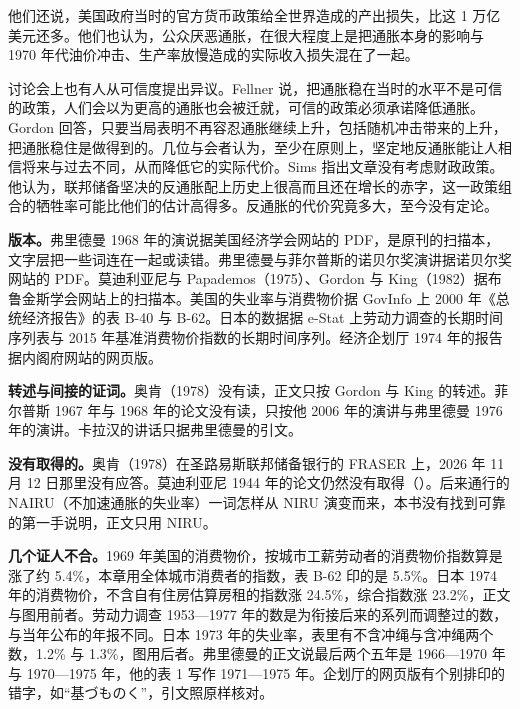 他们还说，美国政府当时的官方货币政策给全世界造成的产出损失，比这 1 万亿美元还多\cite{gordon1982}。他们也认为，公众厌恶通胀，在很大程度上是把通胀本身的影响与 1970 年代油价冲击、生产率放慢造成的实际收入损失混在了一起\cite{gordon1982}。

讨论会上也有人从可信度提出异议。Fellner 说，把通胀稳在当时的水平不是可信的政策，人们会以为更高的通胀也会被迁就，可信的政策必须承诺降低通胀\cite{gordon1982}。Gordon 回答，只要当局表明不再容忍通胀继续上升，包括随机冲击带来的上升，把通胀稳住是做得到的\cite{gordon1982}。几位与会者认为，至少在原则上，坚定地反通胀能让人相信将来与过去不同，从而降低它的实际代价\cite{gordon1982}。Sims 指出文章没有考虑财政政策\cite{gordon1982}。他认为，联邦储备坚决的反通胀配上历史上很高而且还在增长的赤字，这一政策组合的牺牲率可能比他们的估计高得多\cite{gordon1982}。反通胀的代价究竟多大，至今没有定论。

\begin{deeper}[史料说明]
\textbf{版本。}弗里德曼 1968 年的演说据美国经济学会网站的 PDF，是原刊的扫描本，文字层把一些词连在一起或读错。弗里德曼与菲尔普斯的诺贝尔奖演讲据诺贝尔奖网站的 PDF。莫迪利亚尼与 Papademos（1975）、Gordon 与 King（1982）据布鲁金斯学会网站上的扫描本。美国的失业率与消费物价据 GovInfo 上 2000 年《总统经济报告》的表 B-40 与 B-62。日本的数据据 e-Stat 上劳动力调查的长期时间序列表与 2015 年基准消费物价指数的长期时间序列。经济企划厅 1974 年的报告据内阁府网站的网页版。

\textbf{转述与间接的证词。}奥肯（1978）没有读，正文只按 Gordon 与 King 的转述。菲尔普斯 1967 年与 1968 年的论文没有读，只按他 2006 年的演讲与弗里德曼 1976 年的演讲。卡拉汉的讲话只据弗里德曼的引文。

\textbf{没有取得的。}奥肯（1978）在圣路易斯联邦储备银行的 FRASER 上，2026 年 11 月 12 日那里没有应答。莫迪利亚尼 1944 年的论文仍然没有取得（）。后来通行的 NAIRU（不加速通胀的失业率）一词怎样从 NIRU 演变而来，本书没有找到可靠的第一手说明，正文只用 NIRU。

\textbf{几个证人不合。}1969 年美国的消费物价，按城市工薪劳动者的消费物价指数算是涨了约 5.4\%，本章用全体城市消费者的指数，表 B-62 印的是 5.5\%。日本 1974 年的消费物价，不含自有住房估算房租的指数涨 24.5\%，综合指数涨 23.2\%，正文与图用前者。劳动力调查 1953—1977 年的数是为衔接后来的系列而调整过的数，与当年公布的年报不同。日本 1973 年的失业率，表里有不含冲绳与含冲绳两个数，1.2\% 与 1.3\%，图用后者。弗里德曼的正文说最后两个五年是 1966—1970 年与 1970—1975 年，他的表 1 写作 1971—1975 年。企划厅的网页版有个别排印的错字，如“基づものく”，引文照原样核对。
\end{deeper}

